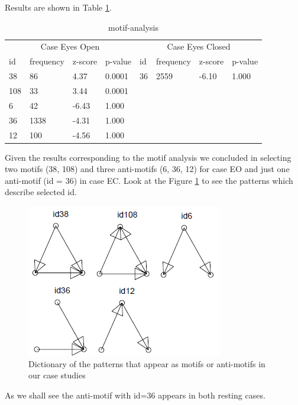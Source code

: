 \documentclass[%
 aip,
 jmp,%
 amsmath,amssymb,
 reprint,%
]{revtex4-1}
\begin{document}
Results are shown in Table \ref{table:motif-analysis}.\\

\begin{table}[]
	\centering
	\begin{tabular}{llllllll}
		\multicolumn{4}{c}{Case Eyes Open} & \multicolumn{4}{c}{Case Eyes Closed} \\
		id & frequency & z-score & p-value & id & frequency & z-score & p-value \\
		38& 86 & 4.37 & 0.0001 &  36& 2559 & -6.10 & 1.000 \\
		108& 33  &3.44  & 0.0001 &  &  &  & \\
		6 & 42 & -6.43 & 1.000 & & & & \\
		36 & 1338 & -4.31 & 1.000 & & & & \\
		12 & 100 & -4.56 & 1.000 & & & & \\
		
	\end{tabular}
	\caption{motif-analysis}
	\label{table:motif-analysis}
\end{table}

Given the results corresponding to the motif analysis we concluded in selecting two motifs (38, 108) and  three anti-motifs (6, 36, 12) for case EO and just one anti-motif (id = 36) in case EC. Look at the Figure \ref{fig:motifswefound} to see the patterns which describe selected id.

\begin{figure}
	\centering
	\includegraphics[width=0.7\linewidth]{../motifs_we_found}
	\caption{Dictionary of the patterns that appear as motifs or anti-motifs in our case studies}
	\label{fig:motifswefound}
\end{figure}


As we shall see the anti-motif with id=36 appears in both resting cases.
\end{document}

